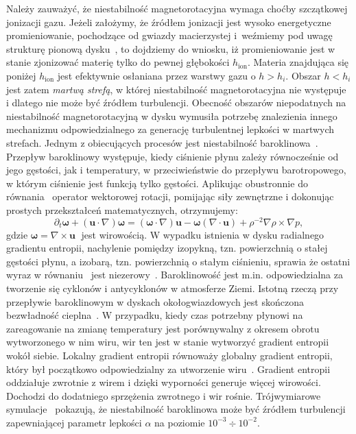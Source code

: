 \par Należy zauważyć, że niestabilność magnetorotacyjna wymaga choćby
szczątkowej jonizacji gazu. Jeżeli założymy, że źródłem jonizacji jest wysoko
energetyczne promieniowanie, pochodzące od gwiazdy macierzystej i~weźmiemy pod
uwagę strukturę pionową dysku~, to dojdziemy do wniosku, iż
promieniowanie jest w stanie zjonizować materię tylko do pewnej głębokości
$h_{\textrm{ion}}$. Materia znajdująca się poniżej $h_{\textrm{ion}}$ jest
efektywnie osłaniana przez warstwy gazu o $h > h_i$.  Obszar $h < h_i$ jest
zatem \emph{martwą strefą}, w której niestabilność magnetorotacyjna nie
występuje~\cite{DFT10} i dlatego nie może być źródłem turbulencji. 
Obecność obszarów niepodatnych na niestabilność magnetorotacyjną w dysku
wymusiła potrzebę znalezienia innego mechanizmu odpowiedzialnego za generację
turbulentnej lepkości w martwych strefach. Jednym z obiecujących procesów jest
niestabilność baroklinowa~\cite{KB03, Kl04}. Przepływ baroklinowy występuje,
kiedy ciśnienie płynu zależy równocześnie od jego gęstości, jak i temperatury, w
przeciwieństwie do przepływu barotropowego, w którym ciśnienie jest funkcją
tylko gęstości. Aplikując obustronnie do równania~ operator
wektorowej rotacji, pomijając siły zewnętrzne i dokonując prostych przekształceń
matematycznych, otrzymujemy:
%
\begin{equation}
   \partial_t \mathbf{\omega} + (\mathbf{u}\cdot\nabla)\mathbf{\omega} =
   (\mathbf{\omega}\cdot\nabla)\mathbf{u} -
   \mathbf{\omega}\left(\nabla\cdot\mathbf{u}\right) + \rho^{-2}\nabla \rho \times
      \nabla p,
   \label{eq:vort}
\end{equation}
%
gdzie $\mathbf{\omega}=\nabla\times\mathbf{u}\;$ jest wirowością.  W wypadku
istnienia w dysku radialnego gradientu entropii, nachylenie pomiędzy izopykną,
tzn. powierzchnią o stałej gęstości płynu, a izobarą, tzn. powierzchnią o stałym
ciśnieniu, sprawia że ostatni wyraz w równaniu~ jest
niezerowy~\cite{LK11}. Baroklinowość jest m.in. odpowiedzialna za tworzenie się
cyklonów i antycyklonów w atmosferze Ziemi. Istotną rzeczą przy przepływie
baroklinowym w dyskach okołogwiazdowych jest skończona bezwładność
cieplna~\cite{P07a, P07b}. W przypadku, kiedy czas potrzebny płynowi na
zareagowanie na zmianę temperatury jest porównywalny z okresem obrotu
wytworzonego w nim wiru, wir ten jest w stanie wytworzyć gradient entropii wokół
siebie. Lokalny gradient entropii równoważy globalny gradient entropii, który
był początkowo odpowiedzialny za utworzenie wiru~\cite{KB03}. Gradient entropii
oddziałuje zwrotnie z wirem i dzięki wyporności generuje więcej wirowości.
Dochodzi do dodatniego sprzężenia zwrotnego i wir rośnie. Trójwymiarowe
symulacje~\cite{KB03} pokazują, że niestabilność baroklinowa może być źródłem
turbulencji zapewniającej parametr lepkości $\alpha$ na poziomie
$10^{-3}\div10^{-2}$.

